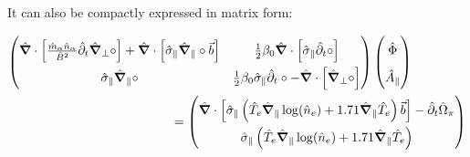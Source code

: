 It can also be compactly expressed in matrix form: 

\begin{align}
	\renewcommand\arraystretch{1.8}
	\begin{pmatrix}
		\hat{\grad}\cdot\left[\frac{\hat{m}_\alpha \hat{n}_\alpha}{ \hat{B}^2}\hat{\partial}_t\hat{\grad}_\perp\circ\right] +  \hat{\grad}\cdot\left[\hat{\sigma}_\parallel\hat{\grad}_\parallel\circ\vec{b}\right] & 
		\frac{1}{2}\beta_0\hat{\grad}\cdot\left[\hat{\sigma}_\parallel\hat{\partial}_t\circ\right]
		\\
		\hat{\sigma}_\parallel\hat{\grad}_\parallel\circ & 
		\frac{1}{2}\beta_0\hat{\sigma}_\parallel\hat{\partial}_t\circ-\hat{\grad}\cdot\left[\hat{\grad}_\perp\circ\right]
	\end{pmatrix}
	\begin{pmatrix}
		\hat{\Phi} \\ \hat{A}_\parallel
	\end{pmatrix} 
	\hspace{1.5cm}\nonumber \\ \label{eq:vorticityEquation_electromagnetic_dedimensionalized_matrix}\hspace{1.5cm}
	= 
	\begin{pmatrix}
		\hat{\grad}\cdot\left[\hat{\sigma}_\parallel\left(
		\hat{T}_e\hat{\grad}_\parallel\log(\hat{n}_e) + 1.71\hat{\grad}_\parallel \hat{T}_e
		\right)\vec{b}\right]-\hat{\partial}_t \hat{\Omega}_\pi \\
		\hat{\sigma}_\parallel\left(
		\hat{T}_e\hat{\grad}_\parallel\log(\hat{n}_e) + 1.71\hat{\grad}_\parallel \hat{T}_e
		\right)
	\end{pmatrix}
\end{align}



